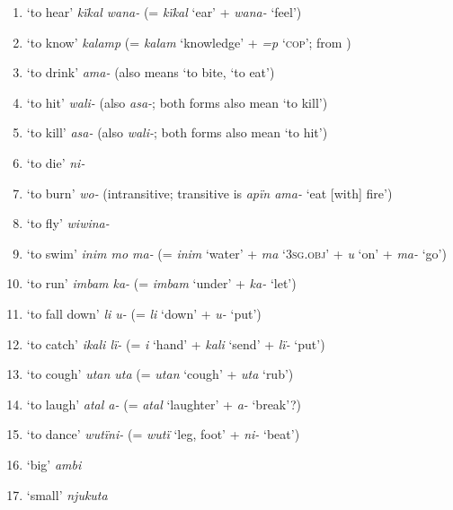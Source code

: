 \begin{enumerate}[noitemsep, label={\arabic*}, align=left, widest=190, labelsep=1ex,leftmargin=*]
\item  ‘to hear’ \textit{kïkal wana-} (= \textit{kïkal} ‘ear’ + \textit{wana-} ‘feel’)

\item  ‘to know’ \textit{kalamp} (= \textit{kalam} ‘knowledge’ + \textit{=p} ‘\textsc{cop}’;  from )

\item  ‘to drink’ \textit{ama-} (also means ‘to bite, ‘to eat’)

\item  ‘to hit’ \textit{wali-} (also \textit{asa-}; both forms also mean ‘to kill’)

\item  ‘to kill’ \textit{asa-} (also \textit{wali{}-}; both forms also mean ‘to hit’)

\item  ‘to die’ \textit{ni-}

\item  ‘to burn’ \textit{wo-} (intransitive; transitive is \textit{apïn ama-} ‘eat [with] fire’)

\item  ‘to fly’ \textit{wiwina-}

\item  ‘to swim’ \textit{inim mo ma-} (= \textit{inim} ‘water’ + \textit{ma} ‘3\textsc{sg.obj}’ + \textit{u} ‘on’ + \textit{ma-} ‘go’)

\item  ‘to run’ \textit{imbam ka-} (= \textit{imbam} ‘under’ + \textit{ka-} ‘let’)

\item  ‘to fall down’  \textit{li u-} (= \textit{li} ‘down’ + \textit{u-} ‘put’)

\item  ‘to catch’ \textit{ikali lï-} (= \textit{i} ‘hand’ + \textit{kali} ‘send’ + \textit{lï-} ‘put’)

\item  ‘to cough’ \textit{utan uta} (= \textit{utan} ‘cough’ + \textit{uta} ‘rub’)

\item  ‘to laugh’ \textit{atal a-} (= \textit{atal} ‘laughter’ + \textit{a-} ‘break’?)

\item  ‘to dance’ \textit{wutïni-} (= \textit{wutï} ‘leg, foot’ + \textit{ni-} ‘beat’)

\item  ‘big’ \textit{ambi}

\item  ‘small’ \textit{njukuta}


\end{enumerate}

